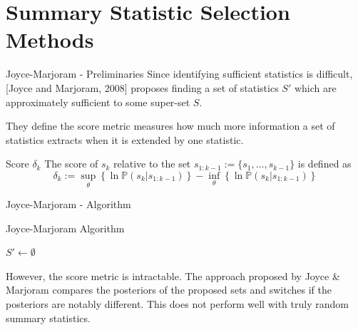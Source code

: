 \documentclass[aspectratio=169]{beamer}
\begin{document}
\section{Summary Statistic Selection Methods}

\begin{frame}{Joyce-Marjoram - Preliminaries}
  Since identifying sufficient statistics is difficult, [Joyce and Marjoram, 2008] proposes finding a set of statistics $S'$ which are approximately sufficient to some super-set $S$.
  \par They define the score metric measures how much more information a set of statistics extracts when it is extended by one statistic.

  \begin{block}{Score $\delta_k$}
    The score of $s_k$ relative to the set $s_{1:k-1}:=\{s_1,\dots,s_{k-1}\}$ is defined as
    \[ \delta_k:=\sup_\theta\left\{\ln\mathbb{P}(s_k|s_{1:k-1})\right\}-\inf_\theta\left\{\ln\mathbb{P}(s_k|s_{1:k-1})\right\} \]
  \end{block}
\end{frame}

\begin{frame}{Joyce-Marjoram - Algorithm}
  \begin{block}{Joyce-Marjoram Algorithm}
    \begin{algorithm}[H]
      $S'\leftarrow\emptyset$\\
    \end{algorithm}
  \end{block}
  However, the score metric is intractable. The approach proposed by Joyce \& Marjoram compares the posteriors of the proposed sets and switches if the posteriors are notably different. This does not perform well with truly random summary statistics.
\end{frame}
\end{document}
